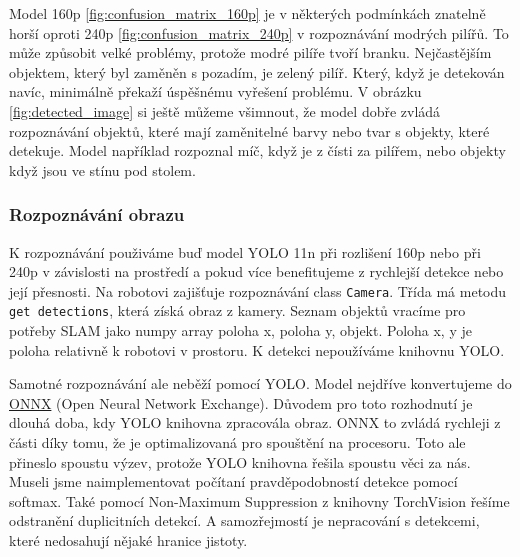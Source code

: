 \documentclass[a4paper,12pt]{article}
\begin{document}
Model 160p \eqref{fig:confusion_matrix_160p} je v některých podmínkách znatelně horší oproti 240p \eqref{fig:confusion_matrix_240p} v rozpoznávání modrých pilířů.
To může způsobit velké problémy, protože modré pilíře tvoří branku. Nejčastějším objektem, který byl zaměněn s pozadím, je zelený pilíř. Který, když je detekován navíc, minimálně překaží úspěšnému vyřešení problému.
V obrázku \eqref{fig:detected_image} si ještě můžeme všimnout, že model dobře zvládá rozpoznávání objektů, které mají zaměnitelné barvy nebo tvar s objekty, které detekuje.
Model například rozpoznal míč, když je z čísti za pilířem, nebo objekty když jsou ve stínu pod stolem.

\subsubsection{Rozpoznávání obrazu}
K rozpoznávání použiváme buď model YOLO 11n při rozlišení 160p nebo při 240p v závislosti na prostředí a pokud více benefitujeme z rychlejší detekce nebo její přesnosti.
Na robotovi zajišťuje rozpoznávání class \texttt{Camera}. Třída má metodu \texttt{get detections}, která získá obraz z kamery. 
Seznam objektů vracíme pro potřeby SLAM jako numpy array poloha x, poloha y, objekt. Poloha x, y je poloha relativně k robotovi v prostoru. K detekci nepoužíváme knihovnu YOLO. 

Samotné rozpoznávání ale neběží pomocí YOLO. Model nejdříve konvertujeme do \href{https://onnx.ai/}{ONNX} (Open Neural Network Exchange). Důvodem pro toto rozhodnutí je dlouhá doba, kdy YOLO knihovna zpracovála obraz. ONNX to zvládá rychleji z části díky tomu, že je optimalizovaná pro spouštění na procesoru.
Toto ale přineslo spoustu výzev, protože YOLO knihovna řešila spoustu věci za nás. Museli jsme naimplementovat počítaní pravděpodobností detekce pomocí softmax. 
Také pomocí Non-Maximum Suppression z knihovny TorchVision řešíme odstranění duplicitních detekcí. A samozřejmostí je nepracování s detekcemi, které nedosahují nějaké hranice jistoty.
\end{document}
